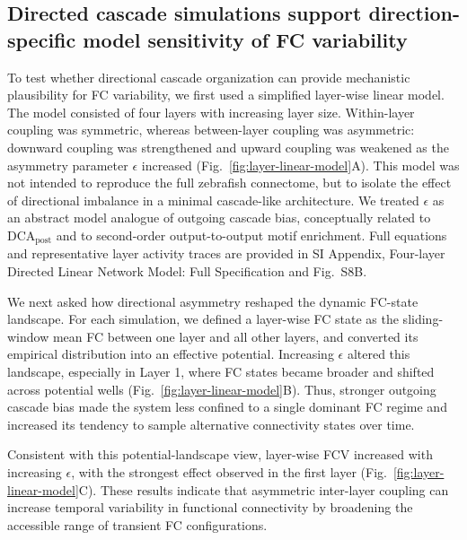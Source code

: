\documentclass[9pt,twocolumn,twoside]{pnas-new}
\begin{document}
\subsection*{Directed cascade simulations support direction-specific model sensitivity of FC variability}

To test whether directional cascade organization can provide mechanistic plausibility for FC variability, we first used a simplified layer-wise linear model. The model consisted of four layers with increasing layer size. Within-layer coupling was symmetric, whereas between-layer coupling was asymmetric: downward coupling was strengthened and upward coupling was weakened as the asymmetry parameter $\epsilon$ increased (Fig.~\ref{fig:layer-linear-model}A). This model was not intended to reproduce the full zebrafish connectome, but to isolate the effect of directional imbalance in a minimal cascade-like architecture. We treated $\epsilon$ as an abstract model analogue of outgoing cascade bias, conceptually related to $\mathrm{DCA}_{\mathrm{post}}$ and to second-order output-to-output motif enrichment. Full equations and representative layer activity traces are provided in SI Appendix, Four-layer Directed Linear Network Model: Full Specification and Fig.~S8B.

We next asked how directional asymmetry reshaped the dynamic FC-state landscape. For each simulation, we defined a layer-wise FC state as the sliding-window mean FC between one layer and all other layers, and converted its empirical distribution into an effective potential. Increasing $\epsilon$ altered this landscape, especially in Layer 1, where FC states became broader and shifted across potential wells (Fig.~\ref{fig:layer-linear-model}B). Thus, stronger outgoing cascade bias made the system less confined to a single dominant FC regime and increased its tendency to sample alternative connectivity states over time.

Consistent with this potential-landscape view, layer-wise FCV increased with increasing $\epsilon$, with the strongest effect observed in the first layer (Fig.~\ref{fig:layer-linear-model}C). These results indicate that asymmetric inter-layer coupling can increase temporal variability in functional connectivity by broadening the accessible range of transient FC configurations.
\end{document}

